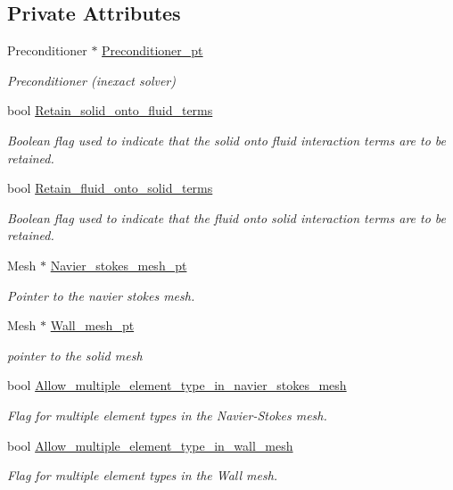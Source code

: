 \subsection*{Private Attributes}
\begin{DoxyCompactItemize}
\item 
Preconditioner $\ast$ \hyperlink{classoomph_1_1SimpleFSIPreconditioner_aa08cfa51beb62ce3d72f47b8e75ce9f3}{Preconditioner\+\_\+pt}
\begin{DoxyCompactList}\small\item\em Preconditioner (inexact solver) \end{DoxyCompactList}\item 
bool \hyperlink{classoomph_1_1SimpleFSIPreconditioner_a62e9e620ecb6022d20aa09b493f6950d}{Retain\+\_\+solid\+\_\+onto\+\_\+fluid\+\_\+terms}
\begin{DoxyCompactList}\small\item\em Boolean flag used to indicate that the solid onto fluid interaction terms are to be retained. \end{DoxyCompactList}\item 
bool \hyperlink{classoomph_1_1SimpleFSIPreconditioner_a0bc8bfc84237a096d6687d902edcf33b}{Retain\+\_\+fluid\+\_\+onto\+\_\+solid\+\_\+terms}
\begin{DoxyCompactList}\small\item\em Boolean flag used to indicate that the fluid onto solid interaction terms are to be retained. \end{DoxyCompactList}\item 
Mesh $\ast$ \hyperlink{classoomph_1_1SimpleFSIPreconditioner_a957b57dc5d05df008c15aec8f3c2ea0f}{Navier\+\_\+stokes\+\_\+mesh\+\_\+pt}
\begin{DoxyCompactList}\small\item\em Pointer to the navier stokes mesh. \end{DoxyCompactList}\item 
Mesh $\ast$ \hyperlink{classoomph_1_1SimpleFSIPreconditioner_a3ad28ce867dc02b67f674ff8e159bff8}{Wall\+\_\+mesh\+\_\+pt}
\begin{DoxyCompactList}\small\item\em pointer to the solid mesh \end{DoxyCompactList}\item 
bool \hyperlink{classoomph_1_1SimpleFSIPreconditioner_a9e1ceded449890704546b3f281bedecb}{Allow\+\_\+multiple\+\_\+element\+\_\+type\+\_\+in\+\_\+navier\+\_\+stokes\+\_\+mesh}
\begin{DoxyCompactList}\small\item\em Flag for multiple element types in the Navier-\/\+Stokes mesh. \end{DoxyCompactList}\item 
bool \hyperlink{classoomph_1_1SimpleFSIPreconditioner_a70094cbfae8c30e11647906cdd7e38c3}{Allow\+\_\+multiple\+\_\+element\+\_\+type\+\_\+in\+\_\+wall\+\_\+mesh}
\begin{DoxyCompactList}\small\item\em Flag for multiple element types in the Wall mesh. \end{DoxyCompactList}\end{DoxyCompactItemize}


